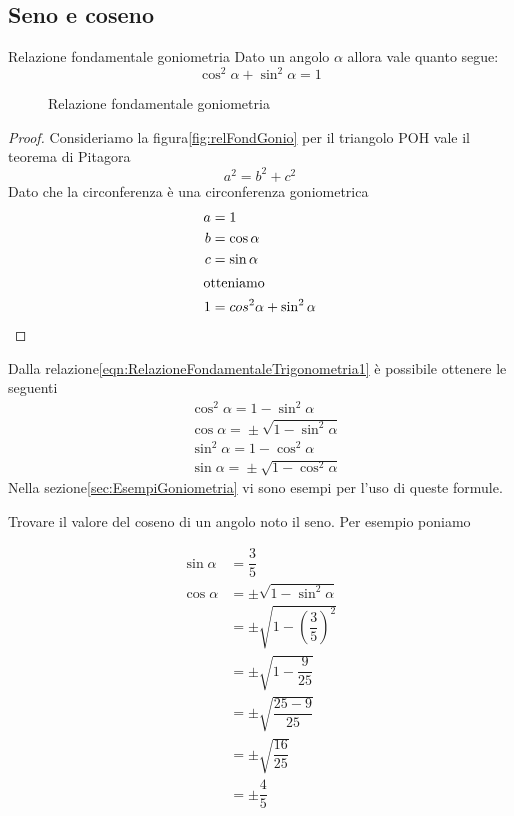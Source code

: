 \subsection{Seno e coseno}
\label{sec:RelazioniFondamentaliSenoCoseno}
\begin{teoremat}{Relazione fondamentale goniometria}{}
Dato un angolo $\alpha$ allora vale quanto segue:
\begin{equation*}
\cos^2\alpha+\sin^2\alpha=1\label{eqn:RelazioneFondamentaleTrigonometria1}
\end{equation*}
\end{teoremat}
\begin{figure}
	\centering
	
\caption{Relazione fondamentale goniometria}\label{fig:relFondGonio}
\end{figure}
\begin{proof}
	Consideriamo la figura\nobs\vref{fig:relFondGonio} per il triangolo POH vale il teorema di Pitagora \[a^2=b^2+c^2\] Dato che la circonferenza è una circonferenza goniometrica
	\begin{align*}
	a&=1\\
	b&=\cos\alpha\\
	c&=\sin\alpha\\
	\intertext{otteniamo}
	1&=cos^2\alpha+\sin^2\alpha\\
	\end{align*}
\end{proof}
Dalla relazione\nobs\vref{eqn:RelazioneFondamentaleTrigonometria1} è possibile ottenere le seguenti
\begin{align*}
&\cos^{2}\alpha={}1-\sin^{2}\alpha\\
&\cos\alpha={}\pm\sqrt{1-\sin^{2}\alpha}\\
&\sin^{2}\alpha={}1-\cos^{2}\alpha \\
&\sin\alpha={}\pm\sqrt{1-\cos^{2}\alpha}
\end{align*}
Nella sezione\nobs\vref{sec:EsempiGoniometria} vi sono esempi per l'uso di queste formule. 
\begin{esempiot}
Trovare il valore del coseno di un angolo noto il seno. Per esempio poniamo 
\end{esempiot}
\begin{align*}
\sin\alpha&{}=\dfrac{3}{5}\\
\cos\alpha&=\pm\sqrt{1-\sin^2\alpha}\\
&=\pm\sqrt{1-\left(\dfrac{3}{5}\right)^2}\\
&=\pm\sqrt{1-\dfrac{9}{25}}\\
&=\pm\sqrt{\dfrac{25-9}{25}}\\
&=\pm\sqrt{\dfrac{16}{25}} \\
&=\pm\dfrac{4}{5} 
\end{align*}
